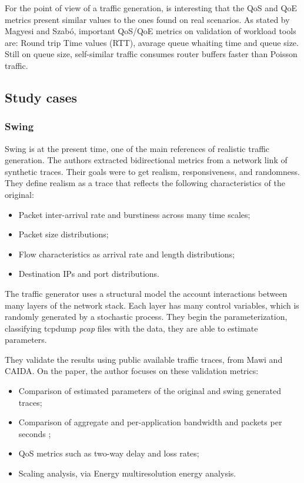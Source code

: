 For the point of view of a traffic generation, is interesting that the QoS and QoE metrics present similar values to the ones found on real scenarios. As stated by Magyesi and Szabó\cite{validate-trafficgen}, important QoS/QoE metrics on validation of workload tools are: Round trip Time values (RTT), avarage queue whaiting time and queue size. Still on queue size, self-similar traffic consumes router buffers faster than Poisson traffic\cite{multi-player-online-game-self-similarity}.


\subsection{Study cases}

\subsubsection{Swing}
Swing\cite{swing-paper} is at the present time, one of the main references of realistic traffic generation.  The authors extracted bidirectional metrics from a network link of synthetic traces. Their goals were to get  realism, responsiveness, and randomness.  They define realism as a trace that reflects the following characteristics of the original: 

\begin{itemize}
\item Packet inter-arrival rate and burstiness across many time scales;
\item Packet size distributions;
\item Flow characteristics as arrival rate and length distributions;
\item Destination IPs and port distributions.
\end{itemize}

The traffic generator uses a structural model the account interactions between many layers of the network stack. Each layer has many control variables, which is randomly generated by a stochastic process.  They begin the parameterization, classifying tcpdump\cite{web-libpcap} \textit{pcap}  files with the data, they are able to estimate parameters. 

They validate the results using public available traffic traces, from Mawi\cite{web-mawi} and CAIDA\cite{web-caida}. On the paper, the author focuses on these validation metrics:

\begin{itemize}
\item Comparison of estimated parameters of the original and swing  generated traces;
\item Comparison of aggregate and per-application bandwidth and packets per seconds ;
\item QoS metrics such as two-way delay and loss rates;
\item Scaling analysis, via Energy multiresolution energy analysis.
\end{itemize}


